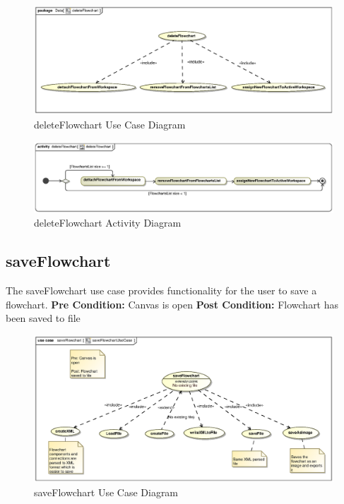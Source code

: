 \documentclass[11pt,a4paper,titlepage]{article}
\begin{document}
\begin{figure}[H]
  \centering
\includegraphics[width=500px]{deleteFlowchart.eps}
\caption{deleteFlowchart Use Case Diagram}
\end{figure}

\begin{figure}[H]
  \centering
\includegraphics[width=500px]{deleteFlowchartActivity.eps}
\caption{deleteFlowchart Activity Diagram}
\end{figure}

\newpage
\subsection{saveFlowchart}
The saveFlowchart use case provides functionality for the user to save a flowchart.\newline\newline
\textbf{Pre Condition:} Canvas is open\newline\newline
\textbf{Post Condition:} Flowchart has been saved to file

\begin{figure}[H]
  \centering
\includegraphics[width=500px]{saveFlowchartUseCase.eps}
\caption{saveFlowchart Use Case Diagram}
\end{figure}
\end{document}
